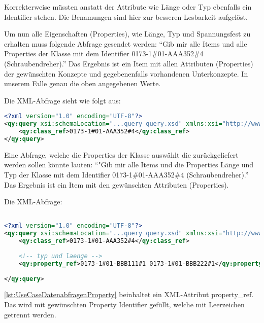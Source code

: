 Korrekterweise müssten anstatt der Attribute wie Länge oder Typ ebenfalls ein Identifier stehen. Die Benamungen sind hier zur besseren Lesbarkeit aufgelöst. 

Um nun alle Eigenschaften (Properties), wie Länge, Typ und Spannungsfest zu erhalten muss folgende Abfrage gesendet werden: 
\enquote{Gib mir alle Items und alle Properties der Klasse mit dem Identifier 0173-1\#01-AAA352\#4 (Schraubendreher).}
Das Ergebnis ist ein Item mit allen Attributen (Properties) der gewünschten Konzepte und gegebenenfalls vorhandenen Unterkonzepte. In unserem Falle genau die oben angegebenen Werte.

Die XML-Abfrage sieht wie folgt aus:

\begin{lstlisting}[caption=Query Beispiel - Daten abfragen, language=XML, label=UseCaseDatenabfragen]
<?xml version="1.0" encoding="UTF-8"?>
<qy:query xsi:schemaLocation="...query query.xsd" xmlns:xsi="http://www.w3.org/2001/XMLSchema-instance" xmlns:cat="...catalogue" xmlns:val="...value" xmlns:qy="...query" xmlns:bas="...basic">
	<qy:class_ref>0173-1#01-AAA352#4</qy:class_ref>
</qy:query>
\end{lstlisting}

Eine Abfrage, welche die Properties der Klasse auswählt die zurückgeliefert werden sollen könnte lauten: 
\enquote{"Gib mir alle Items und die Properties Länge und Typ der Klasse mit dem Identifier 0173-1\#01-AAA352\#4 (Schraubendreher).}
Das Ergebnis ist ein Item mit den gewünschten Attributen (Properties). 

Die XML-Abfrage:
\begin{lstlisting}[caption=Query Beispiel - Daten abfragen mit Propertyeinschränkung, language=XML, label=lst:UseCaseDatenabfragenProperty]

<?xml version="1.0" encoding="UTF-8"?>
<qy:query xsi:schemaLocation="...query query.xsd" xmlns:xsi="http://www.w3.org/2001/XMLSchema-instance" xmlns:cat="...catalogue" xmlns:val="...value" xmlns:qy="...query" xmlns:bas="...basic">
	<qy:class_ref>0173-1#01-AAA352#4</qy:class_ref>
	
	<!-- typ und laenge -->
	<qy:property_ref>0173-1#01-BBB111#1 0173-1#01-BBB222#1</qy:property_ref> 
	
</qy:query>
\end{lstlisting}

\autoref{lst:UseCaseDatenabfragenProperty} beinhaltet ein XML-Attribut property\_ref. Das wird mit gewünschten Property Identifier gefüllt, welche mit Leerzeichen getrennt werden. 

